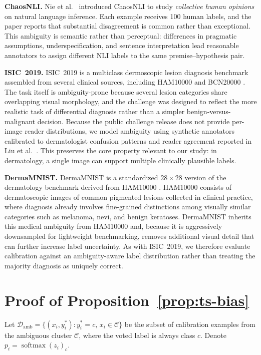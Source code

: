 \documentclass[10pt,journal,compsoc]{IEEEtran}
\begin{document}
\noindent\textbf{ChaosNLI.}
Nie et al.~\cite{nie2020what} introduced ChaosNLI to study \emph{collective human opinions} on natural language inference.  Each example receives 100 human labels, and the paper reports that substantial disagreement is common rather than exceptional.  This ambiguity is semantic rather than perceptual: differences in pragmatic assumptions, underspecification, and sentence interpretation lead reasonable annotators to assign different NLI labels to the same premise--hypothesis pair.

\noindent\textbf{ISIC~2019.}
ISIC~2019 is a multiclass dermoscopic lesion diagnosis benchmark assembled from several clinical sources, including HAM10000 \cite{tschandl2018ham10000} and BCN20000 \cite{combalia2019bcn}.  The task itself is ambiguity-prone because several lesion categories share overlapping visual morphology, and the challenge was designed to reflect the more realistic task of differential diagnosis rather than a simpler benign-versus-malignant decision.  Because the public challenge release does not provide per-image reader distributions, we model ambiguity using synthetic annotators calibrated to dermatologist confusion patterns and reader agreement reported in Liu et al.~\cite{liu2020deep}.  This preserves the core property relevant to our study: in dermatology, a single image can support multiple clinically plausible labels.

\noindent\textbf{DermaMNIST.}
DermaMNIST \cite{yang2023medmnist} is a standardized $28\times28$ version of the dermatology benchmark derived from HAM10000 \cite{tschandl2018ham10000}.  HAM10000 consists of dermatoscopic images of common pigmented lesions collected in clinical practice, where diagnosis already involves fine-grained distinctions among visually similar categories such as melanoma, nevi, and benign keratoses.  DermaMNIST inherits this medical ambiguity from HAM10000 and, because it is aggressively downsampled for lightweight benchmarking, removes additional visual detail that can further increase label uncertainty.  As with ISIC~2019, we therefore evaluate calibration against an ambiguity-aware label distribution rather than treating the majority diagnosis as uniquely correct.

\section{Proof of Proposition~\ref{prop:ts-bias}}
\label{app:proof-ts}

Let $\mathcal{D}_\text{amb}=\{(x_i,y_i^*): y_i^*=c,\, x_i\in\mathcal{C}\}$ be the subset of calibration examples from the ambiguous cluster $\mathcal{C}$, where the voted label is always class $c$.  Denote $p_i=\operatorname{softmax}(z_i)_c$.
\end{document}
